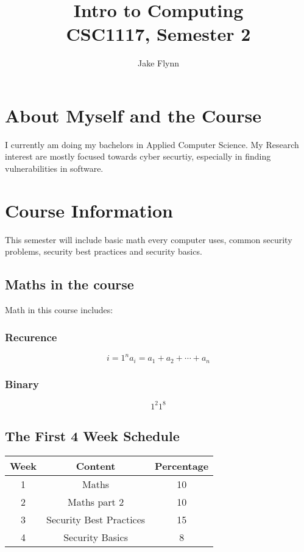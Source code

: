\documentclass{article}
\begin{document}
\title{%
Intro to Computing \\
\large CSC1117, Semester 2}
\author{Jake Flynn} 
\maketitle 

\section{About Myself and the Course}

I currently am doing my bachelors in Applied Computer Science. My Research interest are mostly focused towards cyber securtiy, especially in finding vulnerabilities in software.

\section{Course Information}
This semester will include basic math every computer uses, common security problems, security best practices and security basics.


\subsection{Maths in the course}

Math in this course includes: 

\subsubsection{Recurence}
\[{i=1}^{n} a_i = a_1 + a_2 + \cdots + a_n\]

\subsubsection{Binary}
\[ 1^2 1^8  \]


\subsection{The First 4 Week Schedule}

\begin{tabular}{| c | c | c |} 
 \hline
 Week & Content & Percentage \\ [0.5ex] 
 \hline\hline
 1 & Maths & 10 \\ 
 \hline
 2 & Maths part 2 & 10 \\
 \hline
 3 & Security Best Practices & 15 \\
 \hline
 4 & Security Basics & 8  \\
 \hline
\end{tabular}
\end{document}
